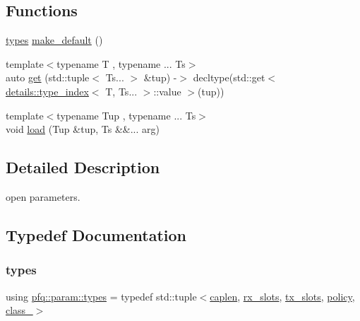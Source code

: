 \subsection*{Functions}
\begin{DoxyCompactItemize}
\item 
\hyperlink{namespacepfq_1_1param_a287394f9fea16ebb76e770334aedd2d5}{types} \hyperlink{namespacepfq_1_1param_af1fd1aeb980688527db587b35f55abf2}{make\+\_\+default} ()
\item 
{\footnotesize template$<$typename T , typename ... Ts$>$ }\\auto \hyperlink{namespacepfq_1_1param_a26825d94a20bcf1cc8353307ea00f5b7}{get} (std\+::tuple$<$ Ts... $>$ \&tup) -\/$>$ decltype(std\+::get$<$ \hyperlink{structpfq_1_1param_1_1details_1_1type__index}{details\+::type\+\_\+index}$<$ T, Ts... $>$\+::value $>$(tup))
\item 
{\footnotesize template$<$typename Tup , typename ... Ts$>$ }\\void \hyperlink{namespacepfq_1_1param_a471f17aaae9cec51e821654d80d825cd}{load} (Tup \&tup, Ts \&\&... arg)
\end{DoxyCompactItemize}


\subsection{Detailed Description}
open parameters. 

\subsection{Typedef Documentation}
\mbox{\label{namespacepfq_1_1param_a287394f9fea16ebb76e770334aedd2d5}} 
\subsubsection{\texorpdfstring{types}{types}}
{\footnotesize\ttfamily using \hyperlink{namespacepfq_1_1param_a287394f9fea16ebb76e770334aedd2d5}{pfq\+::param\+::types} = typedef std\+::tuple$<$\hyperlink{structpfq_1_1param_1_1caplen}{caplen}, \hyperlink{structpfq_1_1param_1_1rx__slots}{rx\+\_\+slots}, \hyperlink{structpfq_1_1param_1_1tx__slots}{tx\+\_\+slots}, \hyperlink{structpfq_1_1param_1_1policy}{policy}, \hyperlink{structpfq_1_1param_1_1class__}{class\+\_\+}$>$}



